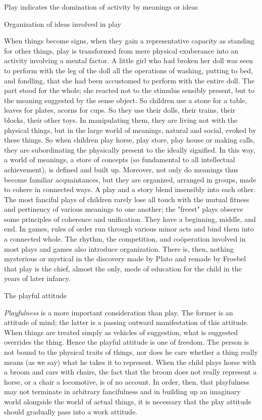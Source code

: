 \documentclass[letterpaper]{book}
\begin{document}
Play indicates the domination of activity by meanings or ideas

Organization of ideas involved in play

When things become signs, when they gain a representative capacity as
standing for other things, play is transformed from mere physical
exuberance into an activity involving a mental factor. A little girl who
had broken her doll was seen to perform with the leg of the doll all the
operations of washing, putting to bed, and fondling, that she had been
accustomed to perform with the entire doll. The part stood for the
whole; she reacted not to the stimulus sensibly present, but to the
meaning suggested by the sense object. So children use a stone for a
table, leaves for plates, acorns for cups. So they use their dolls,
their trains, their blocks, their other toys. In manipulating them, they
are living not with the physical things, but in the large world of
meanings, natural and social, evoked by these things. So when children
play horse, play store, play house or making calls, they are
subordinating the physically present to the ideally signified. In this
way, a world of meanings, a store of concepts (so fundamental to all
intellectual achievement), is defined and built
up.
Moreover, not only do meanings thus become familiar acquaintances, but
they are organized, arranged in groups, made to cohere in connected
ways. A play and a story blend insensibly into each other. The most
fanciful plays of children rarely lose all touch with the mutual fitness
and pertinency of various meanings to one another; the "freest" plays
observe some principles of coherence and unification. They have a
beginning, middle, and end. In games, rules of order run through various
minor acts and bind them into a connected whole. The rhythm, the
competition, and coöperation involved in most plays and games also
introduce organization. There is, then, nothing mysterious or mystical
in the discovery made by Plato and remade by Froebel that play is the
chief, almost the only, mode of education for the child in the years of
later infancy.

The playful attitude

\emph{Playfulness} is a more important consideration than play. The
former is an attitude of mind; the latter is a passing outward
manifestation of this attitude. When things are treated simply as
vehicles of suggestion, what is suggested overrides the thing. Hence the
playful attitude is one of freedom. The person is not bound to the
physical traits of things, nor does he care whether a thing really means
(as we say) what he takes it to represent. When the child plays horse
with a broom and cars with chairs, the fact that the broom does not
really represent a horse, or a chair a locomotive, is of no account. In
order, then, that playfulness may not terminate in arbitrary
fancifulness and in building up an imaginary world alongside the world
of actual things, it is necessary that the play attitude should
gradually pass into a work attitude.
\end{document}
